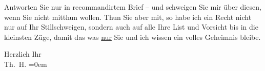 \pstart
           Antworten Sie nur in recommandirtem Brief – und schweigen Sie mir über diesen, wenn
               Sie nicht mitthun wollen. Thun Sie aber mit, so habe ich ein Recht nicht nur auf Ihr
               Stillschweigen, sondern auch auf alle Ihre List und Vorsicht bis in die kleinsten
               Züge, damit das was \uline{nur} Sie und ich wissen ein volles
               Geheimnis bleibe.\pend
           
\pstart
           Herzlich Ihr{\\[\baselineskip]}\spacefill\mbox{Th. H.}\pend
           \leftskip=0em{}\endnumbering{}
\begin{anhang}
\end{anhang}
      